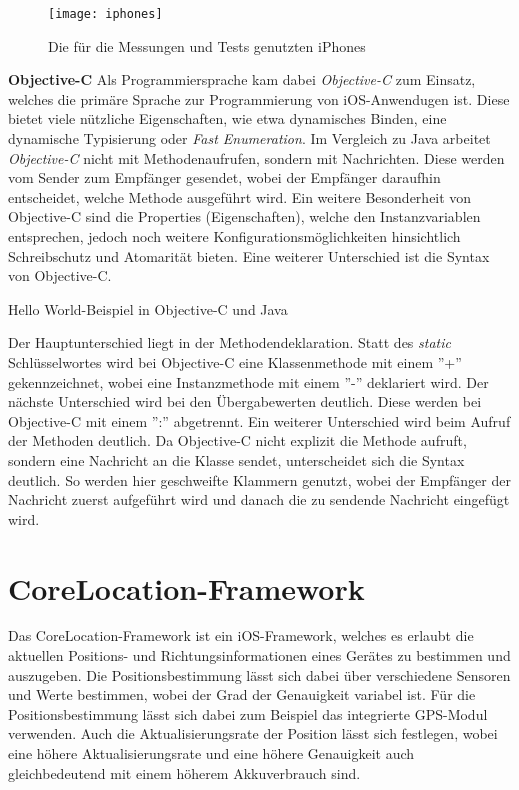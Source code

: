\begin{figure}[htb!]
		\centering
	\texttt{[image: iphones]}
	\caption{Die für die Messungen und Tests genutzten iPhones}
	\label{iphones}
\end{figure}

\textbf{Objective-C}
Als Programmiersprache kam dabei \emph{Objective-C} zum Einsatz, welches die primäre Sprache zur Programmierung von iOS-Anwendugen ist. 
Diese bietet viele nützliche Eigenschaften, wie etwa dynamisches Binden, eine dynamische Typisierung oder \emph{Fast Enumeration}.
Im Vergleich zu Java arbeitet \emph{Objective-C} nicht mit Methodenaufrufen, sondern mit Nachrichten. Diese werden vom Sender zum Empfänger gesendet, wobei der Empfänger daraufhin entscheidet, welche Methode ausgeführt wird. Ein weitere Besonderheit von Objective-C sind die Properties (Eigenschaften), welche den Instanzvariablen entsprechen, jedoch noch weitere Konfigurationsmöglichkeiten hinsichtlich Schreibschutz und Atomarität bieten.
Eine weiterer Unterschied ist die Syntax von Objective-C.

\begin{listing}[htb!]
    \caption{Hello World-Beispiel in Objective-C und Java}
	\label{lst:helloworld_objc}
\end{listing}

Der Hauptunterschied liegt in der Methodendeklaration. Statt des \emph{static} Schlüsselwortes wird bei Objective-C eine Klassenmethode mit einem ''+'' gekennzeichnet, wobei eine Instanzmethode mit einem ''-'' deklariert wird. Der nächste Unterschied wird bei den Übergabewerten deutlich. Diese werden bei Objective-C mit einem '':'' abgetrennt.
Ein weiterer Unterschied wird beim Aufruf der Methoden deutlich. Da Objective-C nicht explizit die Methode aufruft, sondern eine Nachricht an die Klasse sendet, unterscheidet sich die Syntax deutlich. So werden hier geschweifte Klammern genutzt, wobei der Empfänger der Nachricht zuerst aufgeführt wird und danach die zu sendende Nachricht eingefügt wird.


\section{CoreLocation-Framework}
\label{sec:technologies:corelocation}
Das CoreLocation-Framework ist ein iOS-Framework, welches es erlaubt die aktuellen Positions- und Richtungsinformationen eines Gerätes zu bestimmen und auszugeben.
Die Positionsbestimmung lässt sich dabei über verschiedene Sensoren und Werte bestimmen, wobei der Grad der Genauigkeit variabel ist.
Für die Positionsbestimmung lässt sich dabei zum Beispiel das integrierte GPS-Modul verwenden.
Auch die Aktualisierungsrate der Position lässt sich festlegen, wobei eine höhere Aktualisierungsrate und eine höhere Genauigkeit auch gleichbedeutend mit einem höherem Akkuverbrauch sind.

